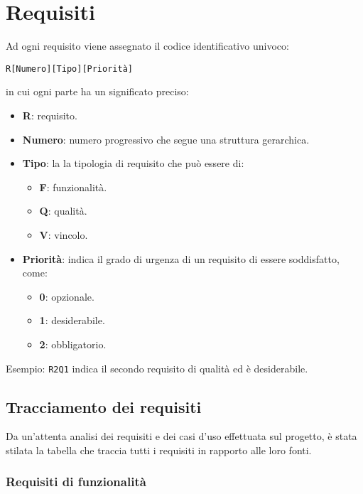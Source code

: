 \section{Requisiti}
Ad ogni requisito viene assegnato il codice identificativo univoco:
	\begin{center}
		\texttt{R[Numero][Tipo][Priorità]}
	\end{center}
	in cui ogni parte ha un significato preciso:
	\begin{itemize}
		\item \textbf{R}: requisito.
		\item \textbf{Numero}: numero progressivo che segue una struttura gerarchica.
		\item \textbf{Tipo}: la la tipologia di requisito che può essere di:
		\begin{itemize}
			\item \textbf{F}: funzionalità.
			\item \textbf{Q}: qualità.
			\item \textbf{V}: vincolo.
		\end{itemize}
		\item \textbf{Priorità}: indica il grado di urgenza di un requisito di essere soddisfatto, come:
		\begin{itemize}
			\item \textbf{0}: opzionale.
			\item \textbf{1}: desiderabile.
			\item \textbf{2}: obbligatorio.
		\end{itemize}
	\end{itemize}


	Esempio: \texttt{R2Q1} indica il secondo requisito di qualità ed è desiderabile.


\subsection{Tracciamento dei requisiti}

Da un'attenta analisi dei requisiti e dei casi d'uso effettuata sul progetto, è stata stilata la tabella che traccia tutti i requisiti in rapporto alle loro fonti.


	\subsubsection{Requisiti di funzionalità}\label{RequisitiFunzionalità}

